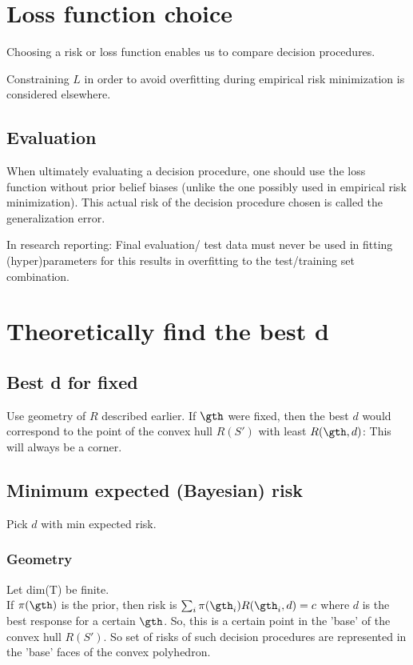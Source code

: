 \documentclass[oneside, article]{memoir}
\begin{document}
\section{Loss function choice}
Choosing a risk or loss function enables us to compare decision procedures.

Constraining $L$ in order to avoid overfitting during empirical risk minimization is considered elsewhere.

\subsection{Evaluation}
When ultimately evaluating a decision procedure, one should use the loss function without prior belief biases (unlike the one possibly used in empirical risk minimization). This actual risk of the decision procedure chosen is called the generalization error.

In research reporting: Final evaluation/ test data must never be used in fitting (hyper)parameters for this results in overfitting to the test/training set combination.

\section{Theoretically find the best d}
\subsection{Best d for fixed }
Use geometry of $R$ described earlier. If $\gth$ were fixed, then the best $d$ would correspond to the point of the convex hull $R(S')$ with least $R(\gth, d)$: This will always be a corner.

\subsection{Minimum expected (Bayesian) risk}
Pick $d$ with min expected risk.

\subsubsection{Geometry}
Let dim(T) be finite.\\ If $\pi(\gth)$ is the prior, then risk is $\sum_i \pi(\gth_i)R(\gth_i,d) = c$ where $d$ is the best response for a certain $\gth$. So, this is a certain point in the 'base' of the convex hull $R(S')$. So set of risks of such decision procedures are represented in the 'base' faces of the convex polyhedron.
\end{document}
